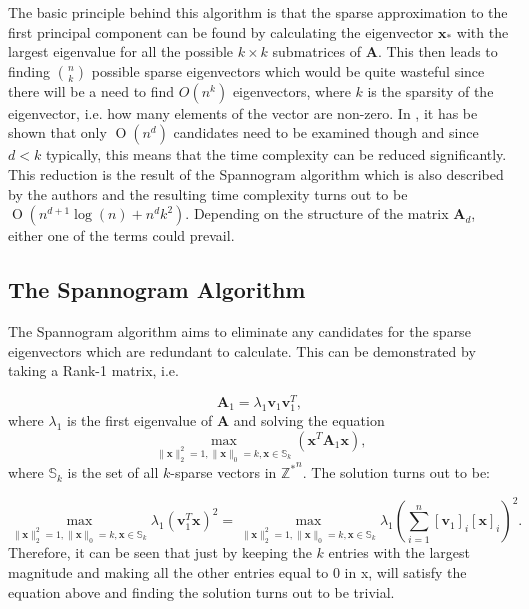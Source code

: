 \documentclass[graybox]{svmult}
\newcommand{\covmat}{\mathbf{A}}
\newcommand{\BigO}[1]{\ensuremath{\operatorname{O}\left(#1\right)}}
\begin{document}
The basic principle behind this algorithm is that the sparse approximation to the first principal component can be found by calculating the eigenvector $\mathbf{x}_*$ with the largest eigenvalue for all the possible $k\times k$ submatrices of $\mathbf{A}$. This then leads to finding $n \choose k$ possible sparse eigenvectors which would be quite wasteful since there will be a need to find $O\left( n^k\right)$ eigenvectors, where $k$ is the sparsity of the eigenvector, i.e. how many elements of the vector are non-zero. In \cite{dimakis}, it has be shown that only $\BigO {n^d}$ candidates need to be examined though and since $d < k$ typically, this means that the time complexity can be reduced significantly. This reduction is the result of the Spannogram algorithm which is also described by the authors and the resulting time complexity turns out to be $\BigO { n^{d+1}\log(n) + n^d k^2 }$. Depending on the structure of the matrix $\covmat_d$, either one of the terms could prevail.


\subsection{The Spannogram Algorithm}

The Spannogram algorithm aims to eliminate any candidates for the sparse eigenvectors which are redundant to calculate. This can be demonstrated by taking a Rank-1 matrix, i.e.

\begin{equation*}
\mathbf{A}_1 = \lambda_1 \mathbf{v}_1 \mathbf{v}_1^T,
\end{equation*}
where $\lambda_1$ is the first eigenvalue of $\mathbf{A}$ and solving the equation
\begin{equation*}
 \underset{\|\mathbf{x}\|_2^2 = 1, \|\mathbf{x}\|_0 = k, \mathbf{x} \in\mathbb{S}_k} \max( \mathbf{x}^T\mathbf{A}_1\mathbf{x}),
\end{equation*}
where $\mathbb{S}_k$ is the set of all $k$-sparse vectors in $\mathbb{Z^*}^n$. The solution turns out to be:

\begin{equation*}
\underset{\|\mathbf{x}\|_2^2 = 1, \|\mathbf{x}\|_0 = k, \mathbf{x} \in\mathbb{S}_k} \max\lambda_1 \left(\mathbf{v}_1^T \mathbf{x}\right)^2 
= \underset{\|\mathbf{x}\|_2^2 = 1, \|\mathbf{x}\|_0 = k, \mathbf{x} \in\mathbb{S}_k} \max \lambda_1\left( \sum_{i = 1}^n [\mathbf{v}_{1}]_i [\mathbf{x}]_i\right)^2.
\end{equation*}
Therefore, it can be seen that just by keeping the $k$ entries with the largest magnitude and making all the other entries equal to 0 in x, will satisfy the equation above and finding the solution turns out to be trivial. 
\end{document}
